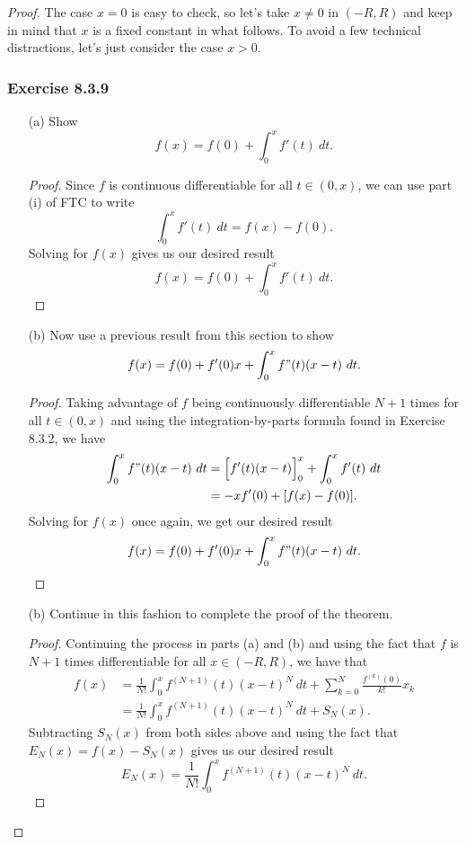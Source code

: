 \begin{proof}
The case \( x = 0  \) is easy to check, so let's take \( x \neq 0  \) in \( (-R ,R ) \) and keep in mind that \( x  \) is a fixed constant in what follows. To avoid a few technical distractions, let's just consider the case \( x > 0  \).

\subsubsection{Exercise 8.3.9} 
\begin{enumerate}
    \item[(a)] Show 
        \[  f(x) = f(0) + \int_{ 0 }^{ x }  f'(t) \  dt. \]
        \begin{proof} 
            Since \( f  \) is continuous differentiable for all  \( t \in (0,x) \), we can use part (i) of FTC to write 
        \[  \int_{ 0 }^{ x } f'(t)  \ dt =  f(x) - f(0). \] Solving for \( f(x)  \) gives us our desired result 
        \[ f(x) = f(0) + \int_{ 0 }^{ x }  f'(t) \ dt. \]
        \end{proof}
    \item[(b)] Now use a previous result from this section to show 
        \[  f(x) = f(0) + f'(0) x + \int_{ 0 }^{ x }  f"(t)(x-t) \  dt. \]
        \begin{proof}
            Taking advantage of \( f  \) being continuously differentiable \( N+1  \) times for all \(  t \in (0,x) \) and using the integration-by-parts formula found in Exercise 8.3.2, we have 
            \begin{align*}  \int_{ 0 }^{ x }  f"(t) (x -t ) \  dt &= \Big[ f'(t) (x-t) \Big]_{0}^{x} + \int_{ 0 }^{ x }  f'(t) \  dt \\
            &= -x f'(0) + [ f(x) - f(0)].  
            \end{align*}
            Solving for \( f(x)  \) once again, we get our desired result
        \[  f(x) = f(0) + f'(0) x + \int_{ 0 }^{ x }  f"(t)(x-t) \  dt. \]
        \end{proof}
    \item[(b)] Continue in this fashion to complete the proof of the theorem.
        \begin{proof}
        Continuing the process in parts (a) and (b) and using the fact that \( f  \) is \( N+1  \) times differentiable for all \( x \in (-R ,R ) \), we have that
        \begin{align*}  f(x) &= \frac{ 1 }{ N! }  \int_{ 0 }^{ x  } f^{(N+1)}(t) (x -t )^{N} \  dt + \sum_{ k=0  }^{ N  } \frac{ f^{(k)}(0) }{ k! } x_{k } \\  
            &= \frac{ 1 }{ N! } \int_{ 0 }^{ x }  f^{(N+1)}(t) (x-t)^{N} \   dt + S_{N}(x).
        \end{align*}
        Subtracting \( S_{N}(x)  \) from both sides above and using the fact that \( E_{N}(x) = f(x) - S_{N}(x)  \) gives us our desired result 
    \[  E_{N}(x) = \frac{ 1 }{ N! } \int_{ 0 }^{ x  }  f^{(N+1) }(t) (x-t)^{N} \  dt.  \]
        \end{proof}
\end{enumerate}
\end{proof}

